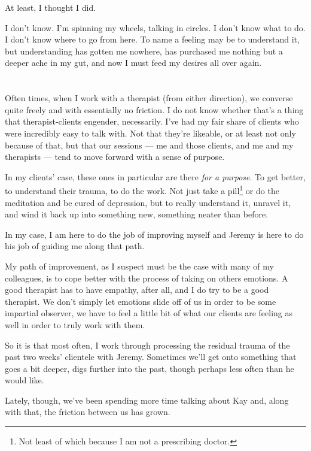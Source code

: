 At least, I thought I did.

I don't know. I'm spinning my wheels, talking in circles. I don't know what to do. I don't know where to go from here. To name a feeling may be to understand it, but understanding has gotten me nowhere, has purchased me nothing but a deeper ache in my gut, and now I must feed my desires all over again.

\section{}

Often times, when I work with a therapist (from either direction), we converse quite freely and with essentially no friction. I do not know whether that's a thing that therapist-clients engender, necessarily. I've had my fair share of clients who were incredibly easy to talk with. Not that they're likeable, or at least not only because of that, but that our sessions --- me and those clients, and me and my therapists --- tend to move forward with a sense of purpose.

In my clients' case, these ones in particular are there \emph{for a purpose}. To get better, to understand their trauma, to do the work. Not just take a pill\footnote{Not least of which because I am not a prescribing doctor.} or do the meditation and be cured of depression, but to really understand it, unravel it, and wind it back up into something new, something neater than before.

In my case, I am here to do the job of improving myself and Jeremy is here to do his job of guiding me along that path.

My path of improvement, as I suspect must be the case with many of my colleagues, is to cope better with the process of taking on others emotions. A good therapist has to have empathy, after all, and I do try to be a good therapist. We don't simply let emotions slide off of us in order to be some impartial observer, we have to feel a little bit of what our clients are feeling as well in order to truly work with them.

So it is that most often, I work through processing the residual trauma of the past two weeks' clientele with Jeremy. Sometimes we'll get onto something that goes a bit deeper, digs further into the past, though perhaps less often than he would like.

Lately, though, we've been spending more time talking about Kay and, along with that, the friction between us has grown.

